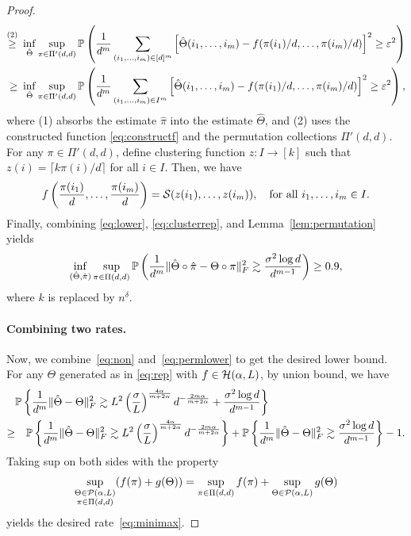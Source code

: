 \documentclass[11pt]{article}
\theoremstyle{definition}
\begin{document}
\begin{proof}
\begin{align}
\stackrel{(2)}{\geq}& \ \inf_{\hat  \Theta}\sup_{\pi\in\Pi'(d,d)}\mathbb{P}\left({1\over d^m}\sum_{(i_1,\ldots,i_m)\in[d]^m}\left[\hat \Theta(i_1,\ldots,i_m)-f(\pi(i_1)/d,\ldots,\pi(i_m)/d)\right]^2\geq \varepsilon^2\right)\notag \\
\geq & \ \inf_{\hat  \Theta}\sup_{\pi\in \Pi'(d,d)}\mathbb{P}\left({1\over d^m}\sum_{(i_1,\ldots,i_m)\in I^m}\left[\hat \Theta(i_1,\ldots,i_m)-f(\pi(i_1)/d,\ldots,\pi(i_m)/d)\right]^2\geq \varepsilon^2\right),
\end{align}
where (1) absorbs the estimate $\hat \pi$ into the estimate $\hat \Theta$, and (2) uses the constructed function \eqref{eq:constructf} and the permutation collections $\Pi'(d,d)$. For any $\pi\in\Pi'(d,d)$, define clustering function $z\colon I\rightarrow[k]$ such that $z(i) = \lceil k\pi(i)/d\rceil$ for all $i\in I$. Then, we have 
\begin{align}\label{eq:clusterrep}
    f\left({\pi(i_1)\over d},\ldots,{\pi(i_m)\over d}\right) = \mathcal{S}(z(i_1),\ldots,z(i_m)),\quad\text{for all } i_1,\ldots,i_m\in I.
\end{align}
Finally, combining \eqref{eq:lower}, \eqref{eq:clusterrep}, and Lemma~\ref{lem:permutation} yields 
\begin{align}\label{eq:permlower}
\inf_{(\hat \Theta,\hat \pi)}\sup_{\pi\in \Pi(d,d)}\mathbb{P}\left({1\over d^m}\lVert\hat \Theta\circ \hat \pi-\Theta\circ \pi\rVert_F^2\gtrsim \frac{\sigma^2\log d}{d^{m-1}}\right) \geq 0.9,
\end{align}
where $k$ is replaced by $n^\delta$.

\paragraph{Combining two rates.} Now, we combine~\eqref{eq:non} and~\eqref{eq:permlower} to get the desired lower bound. For any $\Theta$  generated as in  \eqref{eq:rep} with $f\in\mathcal{H}(\alpha,L)$, by union bound, we have
\begin{align}
&\mathbb{P}\left\{ {1\over d^m}\lVert\hat \Theta- \Theta\rVert_F^2\gtrsim L^2\left(\sigma\over L\right)^{4\alpha\over m+2\alpha}d^{-{2m\alpha\over m+2\alpha}}+\frac{\sigma^2\log d}{d^{m-1}}\right\}\\
\geq &\quad \mathbb{P}\left\{ {1\over d^m}\lVert\hat \Theta-\Theta\rVert_F^2\gtrsim L^2\left(\sigma\over L\right)^{4\alpha\over m+2\alpha}d^{-{2m\alpha\over m+2\alpha}}\right\} +\mathbb{P}\left\{ {1\over d^m}\lVert\hat \Theta- \Theta\rVert_F^2\gtrsim \frac{\sigma^2\log d}{d^{m-1}}\right\}-1.
\end{align}
Taking sup on both sides with the property
\[
\sup_{\substack{\Theta\in \mathcal{P}(\alpha,L)\\\pi\in \Pi(d,d)}}(f(\pi)+g(\Theta))=\sup_{\pi\in \Pi(d,d)}f(\pi)+\sup_{\Theta\in \mathcal{P}(\alpha,L)}g(\Theta)
\]
yields the desired rate~\eqref{eq:minimax}. 
\end{proof}
\end{document}

